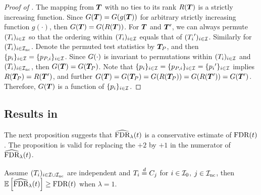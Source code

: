 \begin{proof}[Proof of ]
The mapping from ${\boldsymbol{T}}$ with no ties to its rank $R({\boldsymbol{T}})$ is a strictly increasing function.
Since ${G({\boldsymbol{T}})} = {G(g({\boldsymbol{T}}))}$ for arbitrary strictly increasing function $g(\cdot)$,
then ${G({\boldsymbol{T}})} = {G(R({\boldsymbol{T}}))}$.
For ${\boldsymbol{T}}$ and ${\boldsymbol{T}}'$, we can always permute $({T_{i}})_{i \in  {\mathcal{I}_{}}}$ so that the ordering within $({T_{i}})_{i \in  {\mathcal{I}_{}} }$ equals that of $({T_{i}}')_{i \in  {\mathcal{I}_{}} }$. Similarly for $({T_{i}})_{i \in  {\mathcal{I}_{\text{nc}}} }$.
Denote the permuted test statistics by ${\boldsymbol{T}}_P$, and then $\{{p_{i}}\}_{i \in {\mathcal{I}_{}}} = \{{p_{P,i}}\}_{i \in {\mathcal{I}_{}}}$.
Since ${G(\cdot)}$ is invariant to permutations within $({T_{i}})_{i \in  {\mathcal{I}_{}} }$ and $({T_{i}})_{i \in  {\mathcal{I}_{\text{nc}}} }$, then ${G({\boldsymbol{T}})} = {G({\boldsymbol{T}}_P)}$.
Note that $\{{p_{i}}\}_{i \in {\mathcal{I}_{}}} = \{{p_{P,i}}\}_{i \in {\mathcal{I}_{}}} = \{{p_{i}}'\}_{i \in {\mathcal{I}_{}}}$ implies $R({\boldsymbol{T}}_P) = R({\boldsymbol{T}}')$, and further ${G({\boldsymbol{T}})}
= {G({\boldsymbol{T}}_P)}
= {G(R({\boldsymbol{T}}_P))}
= {G(R({\boldsymbol{T}}'))}
= {G({\boldsymbol{T}}')}$.
Therefore,   ${G({\boldsymbol{T}})}$ is a function of $\{{p_{i}}\}_{i \in {\mathcal{I}_{}}}$.
\end{proof}

\subsection{Results in }\label{sec:results-empirical-process}

The next proposition suggests that $\widehat{\text{FDR}}_{\lambda}(t)$ is a
conservative estimate of $\text{FDR}(t)$. The proposition is valid for replacing the $+2$ by $+1$ in the numerator of $\widehat{\text{FDR}}_{\lambda}(t)$.
\begin{proposition}\label{prop:FDR.estimate}
    Assume $({T_{i}})_{i \in {\mathcal{I}_{}} \cup {\mathcal{I}_{\text{nc}}}}$ are independent and ${T_{i}} \stackrel{d}{=} {C_{j}}$ for $i \in {\mathcal{I}_{0}}$, $j \in {\mathcal{I}_{\text{nc}}}$, then
    $\mathbb{E}\left[\widehat{\text{FDR}}_{\lambda}(t) \right] \ge \text{FDR}(t)$ when
    $\lambda = 1$.
\end{proposition}
\noindent


